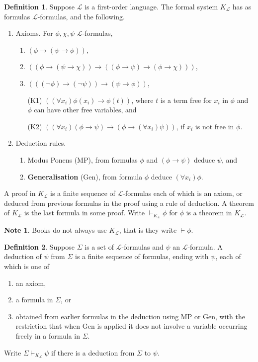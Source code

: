 \documentclass{article}
\renewcommand{\L}{\mathcal{L}}
\newcommand{\rb}[1]{\left( #1 \right)}
\newcommand{\notb}[1]{\rb{\neg #1}}
\newcommand{\impb}[2]{\rb{#1 \rightarrow #2}}
\newcommand{\fab}[1]{\rb{\forall #1}}
\theoremstyle{definition}\newtheorem{definition}{Definition}[subsection]
\theoremstyle{definition}\newtheorem{remark}[definition]{Remark}
\theoremstyle{definition}\newtheorem*{example}{Example}
\theoremstyle{definition}\newtheorem*{note}{Note}
\begin{document}
\begin{definition}
Suppose $ \L $ is a first-order language. The formal system \textbf{$ K_{\L} $} has as formulas $ \L $-formulas, and the following.
\begin{enumerate}
\item Axioms. For $ \phi, \chi, \psi $ $ \L $-formulas,
\begin{enumerate}[label=(A\arabic*)]
\item $ \impb{\phi}{\impb{\psi}{\phi}} $,
\item $ \impb{\impb{\phi}{\impb{\psi}{\chi}}}{\impb{\impb{\phi}{\psi}}{\impb{\phi}{\chi}}} $,
\item $ \impb{\impb{\notb{\phi}}{\notb{\psi}}}{\impb{\psi}{\phi}} $,
\item[(K1)] $ \impb{\fab{x_i}\phi\rb{x_i}}{\phi\rb{t}} $, where $ t $ is a term free for $ x_i $ in $ \phi $ and $ \phi $ can have other free variables, and
\item[(K2)] $ \impb{\fab{x_i}\impb{\phi}{\psi}}{\impb{\phi}{\fab{x_i}\psi}} $, if $ x_i $ is not free in $ \phi $.
\end{enumerate}
\item Deduction rules.
\begin{enumerate}
\item Modus Ponens (MP), from formulas $ \phi $ and $ \impb{\phi}{\psi} $ deduce $ \psi $, and
\item \textbf{Generalisation} (Gen), from formula $ \phi $ deduce $ \fab{x_i}\phi $.
\end{enumerate}
\end{enumerate}
A proof in $ K_{\L} $ is a finite sequence of $ \L $-formulas each of which is an axiom, or deduced from previous formulas in the proof using a rule of deduction. A theorem of $ K_{\L} $ is the last formula in some proof. Write $ \vdash_{K_{\L}} \phi $ for $ \phi $ is a theorem in $ K_{\L} $.
\end{definition}

\begin{note}
Books do not always use $ K_{\L} $, that is they write $ \vdash \phi $.
\end{note}

\begin{definition}
Suppose $ \Sigma $ is a set of $ \L $-formulas and $ \psi $ an $ \L $-formula. A deduction of $ \psi $ from $ \Sigma $ is a finite sequence of formulas, ending with $ \psi $, each of which is one of
\begin{enumerate}
\item an axiom,
\item a formula in $ \Sigma $, or
\item obtained from earlier formulas in the deduction using MP or Gen, with the restriction that when Gen is applied it does not involve a variable occurring freely in a formula in $ \Sigma $.
\end{enumerate}
Write $ \Sigma \vdash_{K_{\L}} \psi $ if there is a deduction from $ \Sigma $ to $ \psi $.
\end{definition}
\end{document}
